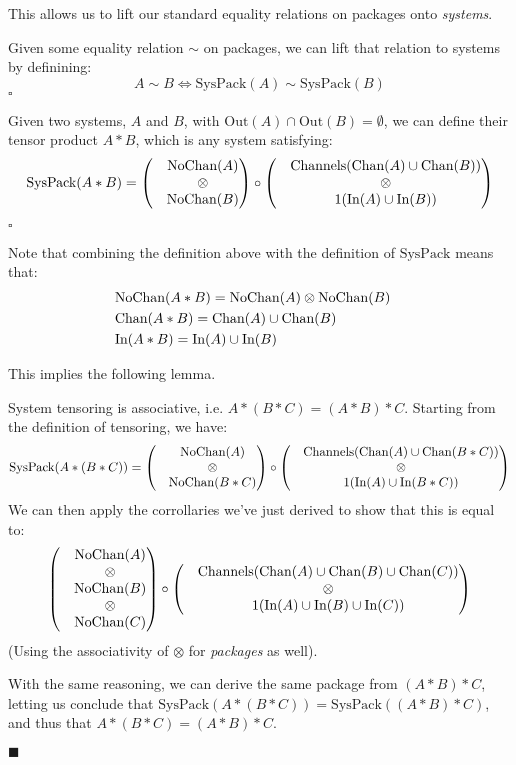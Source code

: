 This allows us to lift our standard equality relations on packages onto
\emph{systems}.
\begin{definition}
Given some equality relation $\sim$ on packages, we can lift that relation
to systems by definining:
$$
A \sim B \iff \text{SysPack}(A) \sim \text{SysPack}(B)
$$
$\square$
\end{definition}

\begin{definition}
Given two systems, $A$ and $B$, with \(\text{Out}(A) \cap \text{Out}(B) = \emptyset\), we can define their tensor product $A * B$,
which is any system satisfying:
$$
\text{SysPack}(A * B) =
\begin{pmatrix}
&\text{NoChan}(A)\cr
&\otimes\cr
&\text{NoChan}(B)\cr
\end{pmatrix}
\circ
\begin{pmatrix}
&\text{Channels}(\text{Chan}(A) \cup \text{Chan}(B))\cr
&\otimes\cr
&1(\text{In}(A) \cup \text{In}(B))\cr
\end{pmatrix}
$$

$\square$
\end{definition}

Note that combining the definition above with the definition of $\text{SysPack}$
means that:
$$
\begin{aligned}
&\text{NoChan}(A * B) = \text{NoChan}(A) \otimes \text{NoChan}(B)\cr
&\text{Chan}(A * B) = \text{Chan}(A) \cup \text{Chan}(B)\cr
&\text{In}(A * B) = \text{In}(A) \cup \text{In}(B)\cr
\end{aligned}
$$

This implies the following lemma.

\begin{lemma}
System tensoring is associative, i.e. $A * (B * C) = (A * B) * C$.
 Starting from the definition of tensoring, we have:
$$
\text{SysPack}(A * (B * C)) =
\begin{pmatrix}
&\text{NoChan}(A)\cr
&\otimes\cr
&\text{NoChan}(B * C)\cr
\end{pmatrix}
\circ
\begin{pmatrix}
&\text{Channels}(\text{Chan}(A) \cup \text{Chan}(B * C))\cr
&\otimes\cr
&1(\text{In}(A) \cup \text{In}(B * C))\cr
\end{pmatrix}
$$
We can then apply the corrollaries we've just derived to show that this
is equal to:
$$
\begin{pmatrix}
&\text{NoChan}(A)\cr
&\otimes\cr
&\text{NoChan}(B)\cr
&\otimes\cr
&\text{NoChan}(C)\cr
\end{pmatrix}
\circ
\begin{pmatrix}
  &\text{Channels}(\text{Chan}(A) \cup \text{Chan}(B) \cup \text{Chan}(C))\cr
&\otimes\cr
  &1(\text{In}(A) \cup \text{In}(B) \cup \text{In}(C))\cr
\end{pmatrix}
$$
(Using the associativity of $\otimes$ for \emph{packages} as well).

With the same reasoning, we can derive the same package from $(A * B) * C$,
letting us conclude that $\text{SysPack}(A * (B * C)) = \text{SysPack}((A * B) * C)$,
and thus that $A * (B * C) = (A * B) * C$.

$\blacksquare$
\end{lemma}

